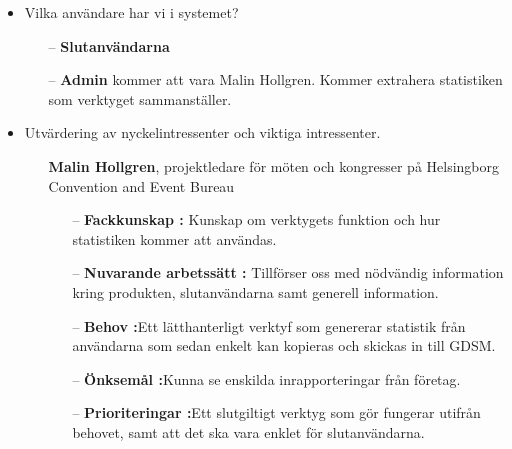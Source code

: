 \documentclass[12pt]{article}
\begin{document}
    \begin{itemize}
        \item Vilka användare har vi i systemet?
            \begin{itemize}
                \item [--] \textbf{Slutanvändarna}
                \item[--] \textbf{Admin} kommer att vara Malin Hollgren. Kommer extrahera statistiken som verktyget sammanställer. 
            \end{itemize}
        \item Utvärdering av nyckelintressenter och viktiga intressenter.
            \begin{itemize}
                \item [] \textbf{Malin Hollgren}, projektledare för möten och kongresser på Helsingborg Convention and Event Bureau
                    \begin{itemize}
                        \item[--] \textbf{Fackkunskap :} Kunskap om verktygets funktion och hur statistiken kommer att användas.
                        \\
                        \item[--] \textbf{Nuvarande arbetssätt :} Tillförser oss med nödvändig information kring produkten, slutanvändarna samt generell information.
                        \\
                        \item[--] \textbf{Behov :}Ett lätthanterligt verktyf som genererar statistik från användarna som sedan enkelt kan kopieras och skickas in till GDSM.
                        \\
                        \item[--] \textbf{Önksemål :}Kunna se enskilda inrapporteringar från företag.
                        \\
                        \item[--] \textbf{Prioriteringar :}Ett slutgiltigt verktyg som gör fungerar utifrån behovet, samt att det ska vara enklet för slutanvändarna.
                        \\
                    \end{itemize}
           

\end{itemize}
\end{itemize}
\end{document}
